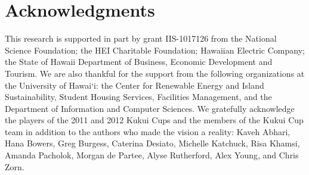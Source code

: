 \documentclass{ict4s_proc_article}
\begin{document}












\section{Acknowledgments}

This research is supported in part by grant IIS-1017126 from the National Science Foundation; the HEI Charitable Foundation; Hawaiian Electric Company; the State of Hawaii Department of Business, Economic Development and Tourism. We are also thankful for the support from the following organizations at the University of Hawai`i: the Center for Renewable Energy and Island Sustainability, Student Housing Services, Facilities Management, and the Department of Information and Computer Sciences. We gratefully acknowledge the players of the 2011 and 2012 Kukui Cups and the members of the Kukui Cup team in addition to the authors who made the vision a reality: Kaveh Abhari, Hana Bowers, Greg Burgess, Caterina Desiato, Michelle Kat\-chuck, Risa Khamsi, Amanda Pacholok, Morgan de Partee, Alyse Rutherford, Alex Young, and Chris Zorn.



\balancecolumns
\end{document}

